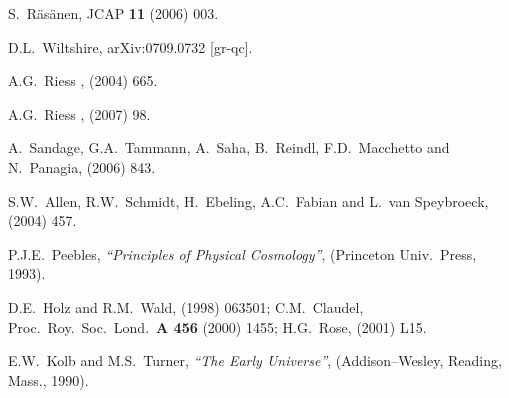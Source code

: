 \documentclass[12pt]{article}
\begin{document}
\begin{thebibliography}{66}
S.~R\"as\"anen,
JCAP {\bf11} (2006) 003. %

D.L.~Wiltshire,
arXiv:0709.0732 [gr-qc].

A.G.~Riess \etal, %
 (2004) 665. %

A.G.~Riess \etal, %
 (2007) 98. %

A.~Sandage, G.A.~Tammann, A.~Saha, B.~Reindl, F.D.~Macchetto and N.~Panagia,
 (2006) 843. %

S.W.~Allen, R.W.~Schmidt, H.~Ebeling, A.C.~Fabian and L.~van Speybroeck,
 (2004) 457. %

P.J.E.~Peebles,
{\em``Principles of Physical Cosmology''}, (Princeton Univ.\ Press, 1993).

D.E.~Holz and R.M.~Wald,
 (1998) 063501; %
C.M.~Claudel,
Proc.\ Roy.\ Soc.\ Lond.\ {\bf A 456} (2000) 1455; %
H.G.~Rose,
 (2001) L15. %

E.W.~Kolb and M.S.~Turner,
{\em``The Early Universe''}, (Addison--Wesley, Reading, Mass., 1990).


\end{thebibliography}
\end{document}
